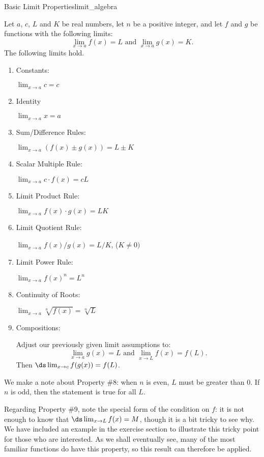 \begin{theorem}{Basic Limit Properties}{limit_algebra}
{
Let $a$, $c$, $L$ and $K$ be real numbers, let $n$ be a positive integer, and let $f$ and $g$ be functions with the following limits: 
$$\lim_{x\to a}f(x) = L \text{\ and\ } \lim_{x\to a} g(x) = K.$$
The following limits hold.
\begin{enumerate}
\item \parbox{160pt}{Constants:} $\displaystyle \lim_{x\to a} c = c$
\item	\parbox{160pt}{Identity }						$\displaystyle \lim_{x\to a} x = a$
\item	\parbox{160pt}{Sum/Difference Rules:} $\displaystyle \lim_{x\to a}(f(x)\pm g(x)) = L\pm K$
\item	\parbox{160pt}{Scalar Multiple Rule:}	$\displaystyle \lim_{x\to a} c\cdot f(x) = cL$
\item	\parbox{160pt}{Limit Product Rule:}	$\displaystyle \lim_{x\to a} f(x)\cdot g(x) = LK$
\item	\parbox{160pt}{Limit Quotient Rule:} $\displaystyle \lim_{x\to a} f(x)/g(x) = L/K$, ($K\neq 0)$
\item	\parbox{160pt}{Limit Power Rule:} 	$\displaystyle \lim_{x\to a} f(x)^n = L^n$
\item	\parbox{160pt}{Continuity of Roots:}		\parbox[t]{185pt}{$\displaystyle \lim_{x\to a} \sqrt[n]{f(x)} = \sqrt[n]{L}$}%
\item	\parbox{80pt}{Compositions:} \parbox[t]{240pt}{Adjust our previously given limit assumptions to: $$\lim_{x\to a}g(x) = L \text{\ and\ } \lim_{x\to L} f(x) = f(L).$$ Then $\ds \lim_{x\to c}f(g(x)) = f(L)$.}
\end{enumerate}
}
\end{theorem}




We make a note about Property \#8: when $n$ is even, $L$ must be greater than 0. If $n$ is odd, then the statement is true for all $L$.

Regarding Property \#9, note the special form of the condition on $f$: it is not enough to
know that $\ds\lim_{x\to L}f(x) = M$, though it is a bit tricky to see
why. We have included an example in the exercise section to illustrate this tricky
point for those who are interested. As we shall eventually see, many of the most familiar functions do have this property, so this result can therefore be applied. 

